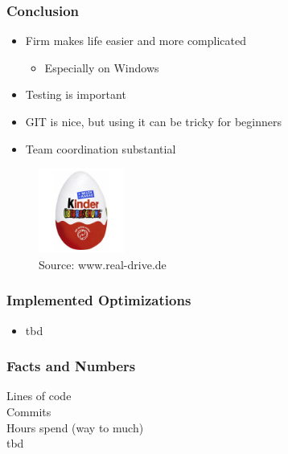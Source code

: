 \documentclass[t]{beamer}
\begin{document}
\begin{frame}
  \frametitle{Conclusion}


\begin{itemize}
	\item Firm makes life easier and more complicated
	\begin{itemize}
		\item Especially on Windows
	\end{itemize}
	\item Testing is important
	\item GIT is nice, but using it can be tricky for beginners
	\item Team coordination substantial
\end{itemize}

 {
\begin{figure}
\includegraphics[width=0.25\textwidth]{images/egg.jpg}
\caption{ Source: www.real-drive.de }
\label{fig:harps_example}
\end{figure}
}
\end{frame}

\begin{frame}
  \frametitle{Implemented Optimizations}
\begin{itemize}
\item tbd
\end{itemize}
\end{frame}

\begin{frame}
  \frametitle{Facts and Numbers}
Lines of code\\
Commits\\
Hours spend (way to much)\\
tbd
\end{frame}
\end{document}
